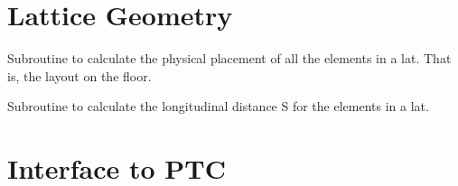 \section{Lattice Geometry}
\label{r:geom}     

\begin{description}

\item[lat_geometry (lat)] \Newline
Subroutine to calculate the physical placement of all the elements in a lat. 
That is, the layout on the floor. 

\item[s_calc (lat)] \Newline
Subroutine to calculate the longitudinal distance S for the elements in a lat. 

\end{description}

\section{Interface to PTC}
\label{r:ptc}      

